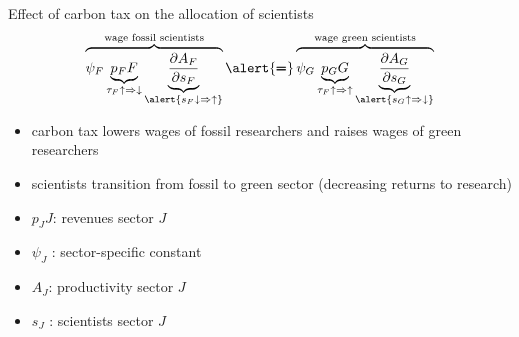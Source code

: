 \documentclass[11pt,aspectratio=169]{beamer}
\begin{document}
\addtocounter{framenumber}{-1}

\begin{frame}{Effect of carbon tax on the allocation of scientists}
	\vspace{0mm}
	\large
	\begin{align*}
		\overbrace{{\psi_F} \underbrace{p_F{F}}_{\tau_F\uparrow\Rightarrow\downarrow}\underbrace{\frac{\partial A_{F}}{\partial s_{F}}}_{\alert{{s_F\downarrow\Rightarrow\uparrow}}}}^{\text{wage fossil scientists}}\alert{\pmb{=}}\overbrace{{\psi_G} \underbrace{p_G{G}}_{\tau_F\uparrow\Rightarrow\uparrow}\underbrace{\frac{\partial A_{G}}{\partial s_{G}}}_{\alert{{s_G\uparrow\Rightarrow\downarrow}}}}^{\text{wage green scientists}}
	\end{align*}
	\normalsize
	\begin{itemize}
		\item carbon tax lowers wages of fossil researchers and raises wages of green researchers
		\vspace{2mm}
		\item scientists transition from fossil to green sector \small{(decreasing returns to research)}
	\end{itemize}
	\small
	\vspace{4mm}
	\hspace{-2mm}
	\begin{minipage}[t!]{0.4\textwidth}
		\vspace{0mm}
		\begin{itemize}
			\item[] $p_JJ$: revenues sector $J$
			\vspace{-2mm}
			\item[] $\psi_J$ : sector-specific constant
		\end{itemize}
	\end{minipage}
	\vspace{-5mm}
	\begin{minipage}[t!]{0.5\textwidth}
		\vspace{0mm}
		\begin{itemize}	
			\item[] $A_J$: productivity sector $J$
			\vspace{-2mm}			
			\item[] $s_J$ : scientists sector $J$
		\end{itemize}
	\end{minipage}
\end{frame}
\end{document}
